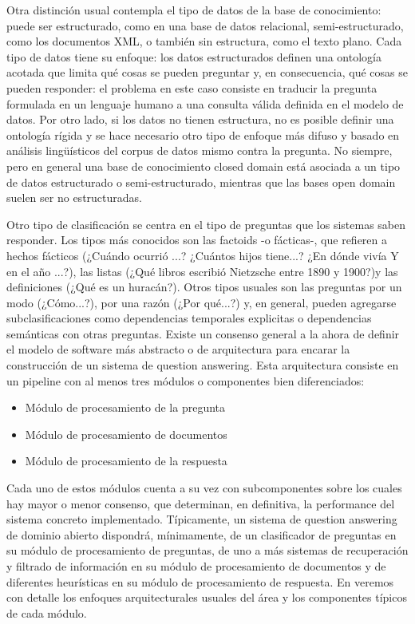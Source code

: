 Otra distinción usual contempla el tipo de datos de la base de conocimiento:  puede ser estructurado, como en una base de datos
relacional, semi-estructurado, como los documentos XML, o también sin estructura, como el texto plano. Cada tipo de datos tiene su enfoque:
los datos estructurados definen una ontología acotada que limita qué cosas se pueden preguntar y, en consecuencia, qué cosas se pueden responder: el problema en este caso consiste en traducir la pregunta formulada en un lenguaje humano a una consulta válida definida en el modelo de datos. Por otro lado, si los datos no tienen estructura, no es posible definir una ontología rígida y se hace necesario otro tipo de enfoque más difuso y basado en análisis lingüísticos del corpus de datos mismo contra la pregunta. No siempre,  pero en general una base de conocimiento closed domain está asociada a un tipo de datos estructurado o semi-estructurado, mientras que las bases open domain
suelen ser no estructuradas.

Otro tipo de clasificación se centra en el tipo de preguntas que los sistemas saben responder. Los tipos más conocidos son las factoids -o fácticas-, que refieren a hechos fácticos (¿Cuándo ocurrió ...? ¿Cuántos hijos tiene...? ¿En dónde vivía Y en el año ...?), las listas (¿Qué libros escribió Nietzsche entre 1890 y 1900?)y las definiciones (¿Qué es un huracán?). Otros tipos usuales son las preguntas por un modo (¿Cómo...?), por una razón (¿Por qué...?) y, en general, pueden agregarse subclasificaciones como dependencias temporales explicitas o dependencias semánticas con otras preguntas.
Existe un consenso general a la ahora de definir el modelo de software más abstracto o de arquitectura para encarar la construcción de un sistema de question answering. Esta arquitectura consiste en un pipeline con al menos tres módulos o componentes bien diferenciados:
\begin{itemize}
\item Módulo de procesamiento de la pregunta
\item Módulo de procesamiento de documentos
\item Módulo de procesamiento de la respuesta
\end{itemize}
Cada uno de estos módulos cuenta a su vez con subcomponentes sobre los cuales hay mayor o menor consenso, que determinan, en definitiva, la performance del sistema concreto implementado. Típicamente, un sistema de question answering de dominio abierto dispondrá, mínimamente, de un clasificador de preguntas en su módulo de procesamiento de preguntas, de uno a más sistemas de recuperación y filtrado de información en su módulo de procesamiento de documentos y de diferentes heurísticas en su módulo de procesamiento de respuesta. En  veremos con detalle los enfoques arquitecturales usuales del área y los componentes típicos de cada módulo.


